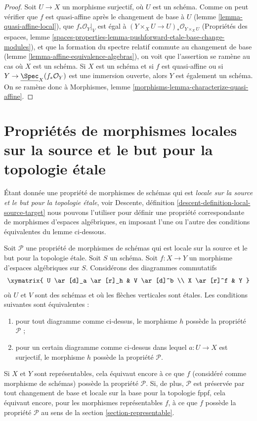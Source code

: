 \begin{proof}
Soit $U \to X$ un morphisme surjectif, où $U$ est un schéma.
Comme on peut vérifier que $f$ est quasi-affine après le changement de base à
$U$ (lemme \ref{lemma-quasi-affine-local}), que $f_*\mathcal{O}_Y|_V$
est égal à $(Y \times_X U \to U)_*\mathcal{O}_{Y \times_X U}$
(Propriétés des espaces, lemme
\ref{spaces-properties-lemma-pushforward-etale-base-change-modules}), et
que la formation du spectre relatif commute au changement de base
(lemme \ref{lemma-affine-equivalence-algebras}),
on voit que l'assertion se ramène au cas où $X$ est un schéma.
Si $X$ est un schéma et si $f$ est quasi-affine ou si
$Y \to \underline{\Spec}_X(f_*\mathcal{O}_Y)$ est une immersion ouverte,
alors $Y$ est également un schéma. On se ramène donc à
Morphismes, lemme \ref{morphisms-lemma-characterize-quasi-affine}.
\end{proof}







\section{Propriétés de morphismes locales sur la source et le but pour la topologie étale}
\label{section-local-source-target}

\noindent
Étant donnée une propriété de morphismes de schémas qui est {\it locale sur la
source et le but pour la topologie étale}, voir
Descente, définition \ref{descent-definition-local-source-target}
nous pouvons l'utiliser pour définir une propriété correspondante
de morphismes d'espaces algébriques, en imposant l'une ou l'autre des
conditions équivalentes du lemme ci-dessous.

\begin{lemma}
\label{lemma-local-source-target}
Soit $\mathcal{P}$ une propriété de morphismes de schémas
qui est locale sur la source et le but pour la topologie étale.
Soit $S$ un schéma.
Soit $f : X \to Y$ un morphisme d'espaces algébriques sur $S$.
Considérons des diagrammes commutatifs
$$
\xymatrix{
U \ar[d]_a \ar[r]_h & V \ar[d]^b \\
X \ar[r]^f & Y
}
$$
où $U$ et $V$ sont des schémas et où les flèches verticales sont étales.
Les conditions suivantes sont équivalentes :
\begin{enumerate}
\item pour tout diagramme comme ci-dessus, le morphisme $h$ possède la propriété
$\mathcal{P}$ ;
\item pour un certain diagramme comme ci-dessus dans lequel $a : U \to X$ est
surjectif, le morphisme $h$ possède la propriété $\mathcal{P}$.
\end{enumerate}
Si $X$ et $Y$ sont représentables, cela équivaut encore à ce que
$f$ (considéré comme morphisme de schémas) possède la propriété $\mathcal{P}$.
Si, de plus, $\mathcal{P}$ est préservée par tout changement de base et
locale sur la base pour la topologie fppf, cela équivaut encore, pour les
morphismes représentables $f$, à ce que $f$ possède la propriété $\mathcal{P}$
au sens de la section \ref{section-representable}.
\end{lemma}

